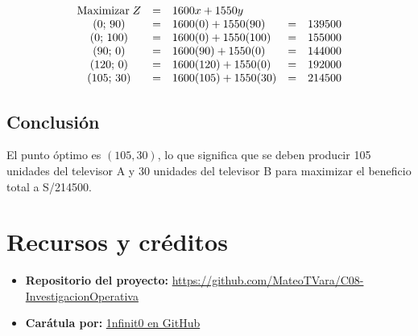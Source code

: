 \documentclass[12pt]{article}
\begin{document}
\vspace{-0.5cm}

\[
\begin{array}{c c l c l}
\text{Maximizar}\;Z & = & 1600x + 1550y        &   &        \\
(0;\, 90)           & = & 1600(0) + 1550(90)   & = & 139500 \\
(0;\, 100)          & = & 1600(0) + 1550(100)  & = & 155000 \\
(90;\, 0)           & = & 1600(90) + 1550(0)   & = & 144000 \\
(120;\, 0)          & = & 1600(120) + 1550(0)  & = & 192000 \\
(105;\, 30)         & = & 1600(105) + 1550(30) & = & 214500 \\
\end{array}
\]

\vspace{-0.5cm}

\subsection*{Conclusión}
El punto óptimo es $(105, 30)$, lo que significa que se deben producir 105 unidades del televisor A y 30 unidades del televisor B para maximizar el beneficio total a S/214500.

\newpage
\section*{Recursos y créditos}

\begin{itemize}
    \item \textbf{Repositorio del proyecto:} \url{https://github.com/MateoTVara/C08-InvestigacionOperativa}
    \item \textbf{Carátula por:} \href{https://github.com/1nfinit0}{1nfinit0 en GitHub}
\end{itemize}
\end{document}
